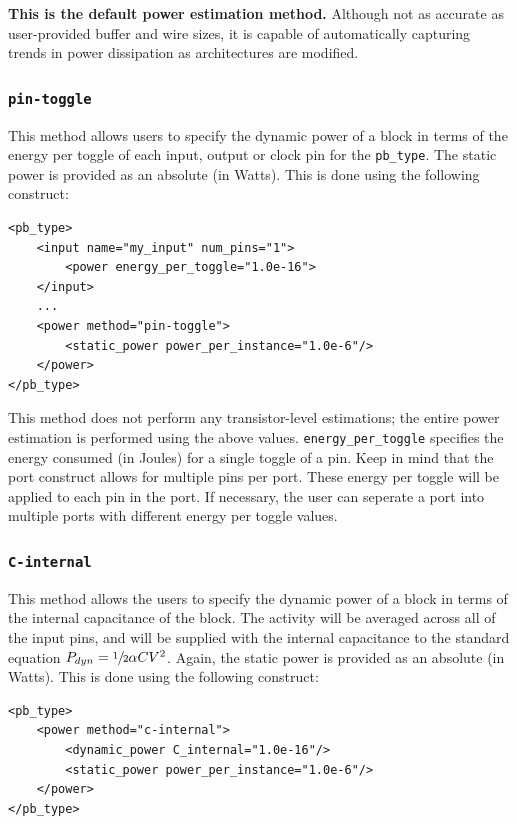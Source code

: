 \documentclass[letterpaper,twoside,10pt]{article}
\begin{document}
\textbf{This is the default power estimation method.}  Although not as accurate as user-provided buffer and wire sizes, it is capable of automatically capturing trends in power dissipation as architectures are modified.  

\subsubsection{\texttt{pin-toggle}}
This method allows users to specify the dynamic power of a block in terms of the energy per toggle of each input, output or clock pin for the \texttt{pb\_type}.  The static power is provided as an absolute (in Watts). This is done using the following construct:

\begin{BVerbatim}[bgcolor=LightGray, boxwidth=\textwidth] 
<pb_type>
	<input name="my_input" num_pins="1">
		<power energy_per_toggle="1.0e-16">
	</input>
	...
	<power method="pin-toggle">
		<static_power power_per_instance="1.0e-6"/>
	</power>
</pb_type>
\end{BVerbatim}

This method does not perform any transistor-level estimations; the entire power estimation is performed using the above values.  \texttt{energy\_per\_toggle} specifies the energy consumed (in Joules) for a single toggle of a pin.  Keep in mind that the port construct allows for multiple pins per port.  These energy per toggle will be applied to each pin in the port.  If necessary, the user can seperate a port into multiple ports with different energy per toggle values.

\subsubsection{\texttt{C-internal}}
This method allows the users to specify the dynamic power of a block in terms of the internal capacitance of the block.  The activity will be averaged across all of the input pins, and will be supplied with the internal capacitance to the standard equation $P_{dyn}=\sfrac{1}{2}\alpha CV^2$.  Again, the static power is provided as an absolute (in Watts).  This is done using the following construct:

\begin{BVerbatim}[bgcolor=LightGray, boxwidth=\textwidth] 
<pb_type>
	<power method="c-internal">
		<dynamic_power C_internal="1.0e-16"/>
		<static_power power_per_instance="1.0e-6"/>
	</power>
</pb_type>
\end{BVerbatim}
\end{document}
